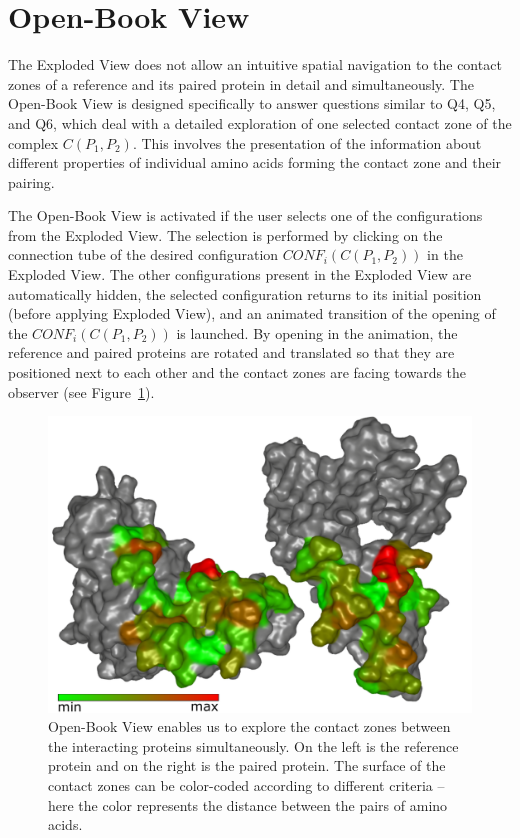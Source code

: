 \documentclass[twocolumn]{bmcart}%
\def\OpBook {Open-Book View\xspace}
\def\ExpView {Exploded View\xspace}
\begin{document}

\section{Open-Book View}
The \ExpView does not allow an intuitive spatial navigation to the contact zones of a reference and its paired protein in detail and simultaneously.
The \OpBook is designed specifically to answer questions similar to Q4, Q5, and Q6, which deal with a detailed exploration of one selected contact zone of the complex $C(P_1,P_2)$.
This involves the presentation of the information about different properties of individual amino acids forming the contact zone and their pairing.

The \OpBook is activated if the user selects one of the configurations from the \ExpView. 
The selection is performed by clicking on the connection tube of the desired configuration $CONF_i(C(P_1,P_2))$ in the \ExpView.
The other configurations present in the \ExpView are automatically hidden, the selected configuration returns to its initial position (before applying \ExpView), and an animated transition of the opening of the $CONF_i(C(P_1,P_2))$ is launched.
By opening in the animation, the reference and paired proteins are rotated and translated so that they are positioned next to each other and the contact zones are facing towards the observer (see Figure~\ref{fig:book}). 

\begin{figure}[tb]
  \centering
  \vspace{-3pt}
  \includegraphics[width=0.9\columnwidth]{images/figure6.pdf}
  \vspace{-3pt}
  \caption{\OpBook enables us to explore the contact zones between the interacting proteins simultaneously. On the left is the reference protein and on the right is the paired protein. The surface of the contact zones can be color-coded according to different criteria -- here the color represents the distance between the pairs of amino acids.}
  \label{fig:book}
\end{figure}
\end{document}
